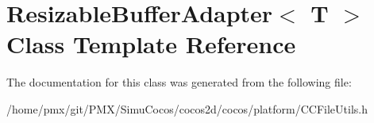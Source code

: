 \hypertarget{classResizableBufferAdapter}{}\section{Resizable\+Buffer\+Adapter$<$ T $>$ Class Template Reference}
\label{classResizableBufferAdapter}


The documentation for this class was generated from the following file\+:\begin{DoxyCompactItemize}
\item 
/home/pmx/git/\+P\+M\+X/\+Simu\+Cocos/cocos2d/cocos/platform/C\+C\+File\+Utils.\+h\end{DoxyCompactItemize}
